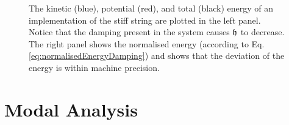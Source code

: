 {\begin{figure}[h]
    \centering
      \caption{The kinetic (blue), potential (red), and total (black) energy of an implementation of the stiff string are plotted in the left panel. Notice that the damping present in the system causes $\mathfrak{h}$ to decrease. The right panel shows the normalised energy (according to Eq. \eqref{eq:normalisedEnergyDamping}) and shows that the deviation of the energy is within machine precision. \label{fig:energyStiffString}}
\end{figure}

\section{Modal Analysis}

}

